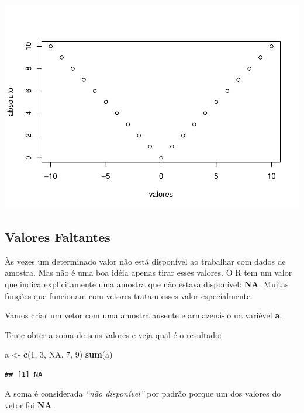 \documentclass[
]{book}
\newenvironment{Shaded}{\begin{snugshade}}{\end{snugshade}}
\newcommand{\DecValTok}[1]{\textcolor[rgb]{0.00,0.00,0.81}{#1}}
\newcommand{\KeywordTok}[1]{\textcolor[rgb]{0.13,0.29,0.53}{\textbf{#1}}}
\newcommand{\NormalTok}[1]{#1}
\newcommand{\OtherTok}[1]{\textcolor[rgb]{0.56,0.35,0.01}{#1}}
\newcommand{\StringTok}[1]{\textcolor[rgb]{0.31,0.60,0.02}{#1}}
\begin{document}
\includegraphics{TudodoR_files/figure-latex/unnamed-chunk-47-1.pdf}

\hypertarget{valores-faltantes}{%
\subsection{Valores Faltantes}\label{valores-faltantes}}

Às vezes um determinado valor não está disponível ao trabalhar com dados de amostra. Mas não é uma boa idéia apenas tirar esses valores. O R tem um valor que indica explicitamente uma amostra que não estava disponível: \textbf{NA}. Muitas funções que funcionam com vetores tratam esses valor especialmente.

Vamos criar um vetor com uma amostra ausente e armazená-lo na variével \textbf{a}.

Tente obter a soma de seus valores e veja qual é o resultado:

\begin{Shaded}
\begin{Highlighting}[]
\NormalTok{a <-}\StringTok{ }\KeywordTok{c}\NormalTok{(}\DecValTok{1}\NormalTok{, }\DecValTok{3}\NormalTok{, }\OtherTok{NA}\NormalTok{, }\DecValTok{7}\NormalTok{, }\DecValTok{9}\NormalTok{)}
\KeywordTok{sum}\NormalTok{(a)}
\end{Highlighting}
\end{Shaded}

\begin{verbatim}
## [1] NA
\end{verbatim}

A soma é considerada \emph{``não disponível''} por padrão porque um dos valores do vetor foi \textbf{NA}.
\end{document}
